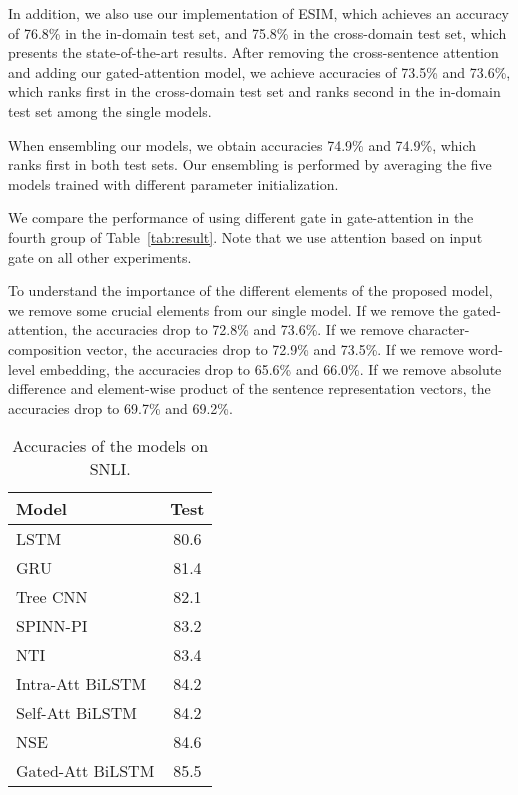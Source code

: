 \documentclass[11pt,letterpaper]{article}
\begin{document}
In addition, we also use our implementation of ESIM, which achieves an accuracy of 76.8\% in the in-domain test set, and 75.8\% in the cross-domain test set, which presents the state-of-the-art results. 
After removing the cross-sentence attention and adding our gated-attention model, we achieve accuracies of 73.5\% and 73.6\%, which ranks first in the cross-domain test set and ranks second in the in-domain test set among the single models. 

When ensembling our models, we obtain accuracies 74.9\% and 74.9\%, which ranks first in both test sets. Our ensembling is performed by averaging the five models trained with different parameter initialization.

We compare the performance of using different gate in gate-attention in the fourth group of Table~\ref{tab:result}. Note that we use attention based on input gate on all other experiments.

To understand the importance of the different elements of the proposed model, we remove some crucial elements from our single model. 
If we remove the gated-attention, the accuracies drop to 72.8\% and 73.6\%. 
If we remove character-composition vector, the accuracies drop to 72.9\% and 73.5\%. If we remove word-level embedding, the accuracies drop to 65.6\% and 66.0\%. If we remove absolute difference and element-wise product of the sentence representation vectors, the accuracies drop to 69.7\% and 69.2\%. 

\begin{table}[t!]
\renewcommand{\arraystretch}{0.9}
\centering
\begin{tabular}{|l|c|}
\hline
Model     & Test\\
\hline
LSTM~\citep{Bowman:D15-1075} & 80.6 \\
GRU~\citep{DBLP:journals/corr/VendrovKFU15} & 81.4 \\
Tree CNN~\citep{Mou:P16-2022} & 82.1 \\
SPINN-PI~\citep{Bowman:P16-1139} & 83.2 \\
NTI~\citep{DBLP:journals/corr/MunkhdalaiY16b} & 83.4 \\
Intra-Att BiLSTM~\citep{DBLP:journals/corr/LiuSLW16} & 84.2 \\
Self-Att BiLSTM~\citep{DBLP:journals/corr/LinFSYXZB17} & 84.2 \\
NSE~\citep{DBLP:journals/corr/MunkhdalaiY16} & 84.6 \\
\hline
Gated-Att BiLSTM & 85.5 \\
\hline
\end{tabular}
\caption{Accuracies of the models on SNLI. }
\label{tab:snli}
\end{table}
\end{document}
